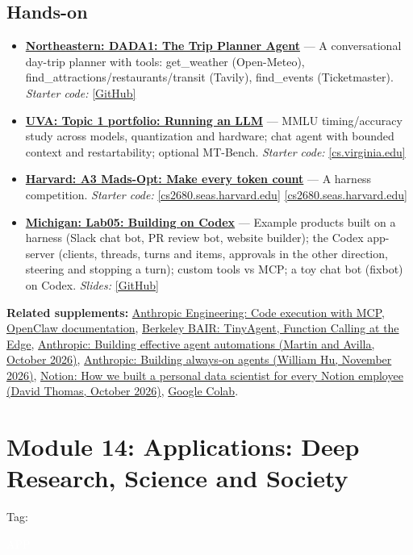 \documentclass[10pt,oneside]{report}
\newcommand{\tg}[1]{{\setlength{\fboxsep}{1.2pt}\colorbox{tag#1}{\kern1pt\textcolor{white}{\sffamily\bfseries\fontsize{5.5}{6}\selectfont\strut #1}\kern1.5pt}}}
\begin{document}
\section{Hands-on}
\begin{itemize}
\item \hyperlink{asg-NEU-1}{\textbf{Northeastern: DADA1: The Trip Planner Agent}} --- A conversational day-trip planner with tools: get\_\allowbreak{}weather (Open-Meteo), find\_\allowbreak{}attractions/restaurants/transit (Tavily), find\_\allowbreak{}events (Ticketmaster). \textit{Starter code:} \href{https://github.com/agenticllms/lecture-files/tree/main/DADA1}{[GitHub]}
\item \hyperlink{asg-UVA-1}{\textbf{UVA: Topic 1 portfolio: Running an LLM}} --- MMLU timing/accuracy study across models, quantization and hardware; chat agent with bounded context and restartability; optional MT-Bench. \textit{Starter code:} \href{https://www.cs.virginia.edu/\%7Ermw7my/Courses/AgenticAISpring2026/Topic1Running/Running_an_LLM.html}{[cs.virginia.edu]}
\item \hyperlink{asg-HARV-3}{\textbf{Harvard: A3 Mads-Opt: Make every token count}} --- A harness competition. \textit{Starter code:} \href{https://cs2680.seas.harvard.edu/assignments/assignment3.tar.gz}{[cs2680.seas.harvard.edu]} \href{https://cs2680.seas.harvard.edu/assignments/assignment3.html}{[cs2680.seas.harvard.edu]}
\item \hyperlink{asg-UMICH-12}{\textbf{Michigan: Lab05: Building on Codex}} --- Example products built on a harness (Slack chat bot, PR review bot, website builder); the Codex app-server (clients, threads, turns and items, approvals in the other direction, steering and stopping a turn); custom tools vs MCP; a toy chat bot (fixbot) on Codex. \textit{Slides:} \href{https://github.com/eecs498-aase/materials/blob/main/labs/Lab05/slides.pdf}{[GitHub]}
\end{itemize}
\textbf{Related supplements:} \hyperref[sup-codeexec]{Anthropic Engineering: Code execution with MCP}, \hyperref[sup-openclaw]{OpenClaw documentation}, \hyperref[sup-tinyagent]{Berkeley BAIR: TinyAgent, Function Calling at the Edge}, \hyperref[sup-anthauto]{Anthropic: Building effective agent automations (Martin and Avilla, October 2026)}, \hyperref[sup-alwayson]{Anthropic: Building always-on agents (William Hu, November 2026)}, \hyperref[sup-notion]{Notion: How we built a personal data scientist for every Notion employee (David Thomas, October 2026)}, \hyperref[sup-colab]{Google Colab}.
\chapter{Module 14: Applications: Deep Research, Science and Society}\hypertarget{mod-APP}{}
{\small Tag: \tg{APP}}
\end{document}
